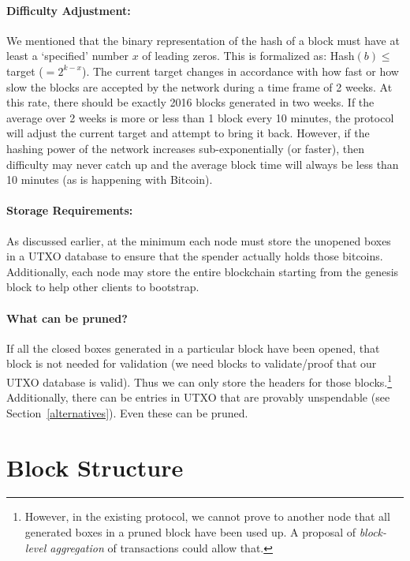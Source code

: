\documentclass[]{report}   %
\begin{document}
\paragraph{Difficulty Adjustment:} We mentioned that the binary representation of the hash of a block must have at least a `specified' number $x$ of leading zeros. This is formalized as: Hash$(b)\leq $ target ($=2^{k-x}$). The current target changes in accordance with how fast or how slow the blocks are accepted by the network during a time frame of 2 weeks. At this rate, there should be exactly 2016 blocks generated in two weeks. If the average over 2 weeks is more or less than 1 block every 10 minutes, the protocol will adjust the current target and attempt to bring it back. However, if the hashing power of the network increases sub-exponentially (or faster), then difficulty may never catch up and the average block time will always be less than 10 minutes (as is happening with Bitcoin). 

\paragraph{Storage Requirements:} As discussed earlier, at the minimum each node must store the unopened boxes in a UTXO database to ensure that the spender actually holds those bitcoins. Additionally, each node may store the entire blockchain starting from the genesis block to help other clients to bootstrap. 

\paragraph{What can be pruned?} If all the closed boxes generated in a particular block have been opened, that block is not needed for validation (we need blocks to validate/proof that our UTXO database is valid). Thus we can only store the headers for those blocks.\footnote{However, in the existing protocol, we cannot prove to another node that all generated boxes in a pruned block have been used up. A proposal of {\em block-level aggregation} of transactions could allow that.} Additionally, there can be entries in UTXO that are provably unspendable (see Section~\ref{alternatives}). Even these can be pruned.

\section{Block Structure} 
\end{document}
